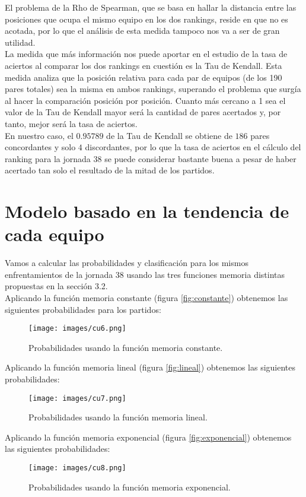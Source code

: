 El problema de la Rho de Spearman, que se basa en hallar la distancia entre las posiciones que ocupa el mismo equipo en los dos rankings, reside en que no es acotada, por lo que el análisis de esta medida tampoco nos va a ser de gran utilidad. \\

La medida que más información nos puede aportar en el estudio de la tasa de aciertos al comparar los dos rankings en cuestión es la Tau de Kendall. Esta medida analiza que la posición relativa para cada par de equipos (de los 190 pares totales) sea la misma en ambos rankings, superando el problema que surgía al hacer la comparación posición por posición. Cuanto más cercano a 1 sea el valor de la Tau de Kendall mayor será la cantidad de pares acertados y, por tanto, mejor será la tasa de aciertos. \\

En nuestro caso, el $0.95789$ de la Tau de Kendall se obtiene de $186$ pares concordantes y solo $4$ discordantes, por lo que la tasa de aciertos en el cálculo del ranking para la jornada 38 se puede considerar bastante buena a pesar de haber acertado tan solo el resultado de la mitad de los partidos.

\section{Modelo basado en la tendencia de cada equipo}
Vamos a calcular las probabilidades y clasificación para los mismos enfrentamientos de la jornada 38 usando las tres funciones memoria distintas propuestas en la sección 3.2.\\

Aplicando la función memoria constante (figura \ref{fig:constante}) obtenemos las siguientes probabilidades para los partidos:
\begin{figure}[H]
	\centering
	\texttt{[image: images/cu6.png]}
	\caption{Probabilidades usando la función memoria constante.}
\end{figure}

Aplicando la función memoria lineal (figura \ref{fig:lineal}) obtenemos las siguientes probabilidades:
\begin{figure}[H]
	\centering
	\texttt{[image: images/cu7.png]}
	\caption{Probabilidades usando la función memoria lineal.}
\end{figure}

Aplicando la función memoria exponencial (figura \ref{fig:exponencial}) obtenemos las siguientes probabilidades:
\begin{figure}[H]
	\centering
	\texttt{[image: images/cu8.png]}
	\caption{Probabilidades usando la función memoria exponencial.}
\end{figure}

